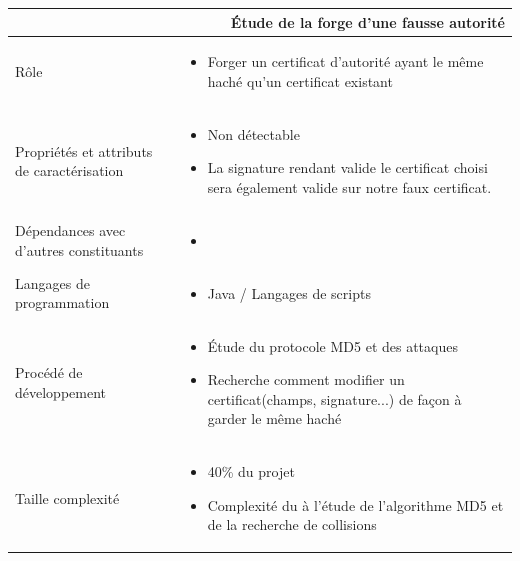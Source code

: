 \documentclass[a4paper,11pt,french]{article}
\begin{document}
\begin{center}
        \vspace*{0.7cm}
        \begin{tabularx}{16cm}{|l|X|}
        \hline
        \multicolumn{2}{|r|}{\textbf{\'Etude de la forge d'une fausse autorité}}\\
        \hline
        R\^ole &  \begin{itemize}\item Forger un certificat d'autorité ayant le même haché qu'un certificat existant  \end{itemize}\\
        \hline
        Propriétés et attributs de caractérisation & \begin{itemize} \item Non détectable \item La signature rendant valide le certificat choisi sera également valide sur notre faux certificat. \end{itemize}\\
        \hline
        Dépendances avec d'autres constituants & \begin{itemize}\item  \end{itemize}\\
        \hline
        Langages de programmation & \begin{itemize} \item Java / Langages de scripts \end{itemize}\\
        \hline
        Procédé de développement & \begin{itemize}\item Étude du protocole MD5 et des attaques \item Recherche comment modifier un certificat(champs, signature...) de façon à garder le même haché \end{itemize}\\
        \hline
        Taille complexité & \begin{itemize}\item 40\% du projet \item Complexité du à l'étude de l'algorithme MD5 et de la recherche de collisions\end{itemize}\\
        \hline
        \end{tabularx}
\end{center}
\end{document}
